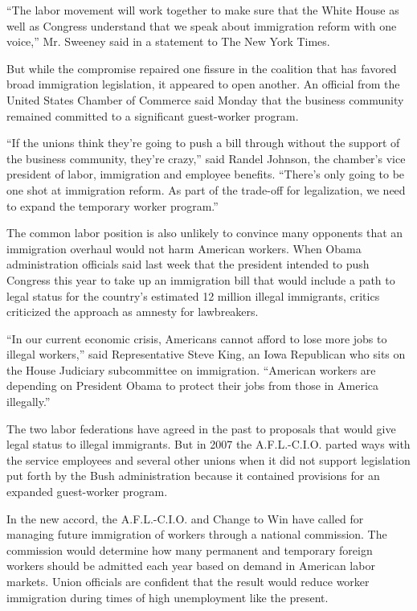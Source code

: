 \documentclass[12pt,a4paper,onecolumn]{article}
\begin{document}
``The labor movement will work together to make sure that the White House as well as Congress
understand that we speak about immigration reform with one voice,'' Mr. Sweeney said in a statement
to The New York Times.

But while the compromise repaired one fissure in the coalition that has favored broad immigration
legislation, it appeared to open another. An official from the United States Chamber of Commerce
said Monday that the business community remained committed to a significant guest-worker program.

``If the unions think they're going to push a bill through without the support of the business
community, they're crazy,'' said Randel Johnson, the chamber's vice president of labor, immigration
and employee benefits. ``There's only going to be one shot at immigration reform. As part of the
trade-off for legalization, we need to expand the temporary worker program.''

The common labor position is also unlikely to convince many opponents that an immigration overhaul
would not harm American workers. When Obama administration officials said last week that the
president intended to push Congress this year to take up an immigration bill that would include a
path to legal status for the country's estimated 12 million illegal immigrants, critics criticized
the approach as amnesty for lawbreakers.

``In our current economic crisis, Americans cannot afford to lose more jobs to illegal workers,''
said Representative Steve King, an Iowa Republican who sits on the House Judiciary subcommittee on
immigration. ``American workers are depending on President Obama to protect their jobs from those in
America illegally.''

The two labor federations have agreed in the past to proposals that would give legal status to
illegal immigrants. But in 2007 the A.F.L.-C.I.O. parted ways with the service employees and several
other unions when it did not support legislation put forth by the Bush administration because it
contained provisions for an expanded guest-worker program.

In the new accord, the A.F.L.-C.I.O. and Change to Win have called for managing future immigration
of workers through a national commission. The commission would determine how many permanent and
temporary foreign workers should be admitted each year based on demand in American labor markets.
Union officials are confident that the result would reduce worker immigration during times of high
unemployment like the present.
\end{document}
